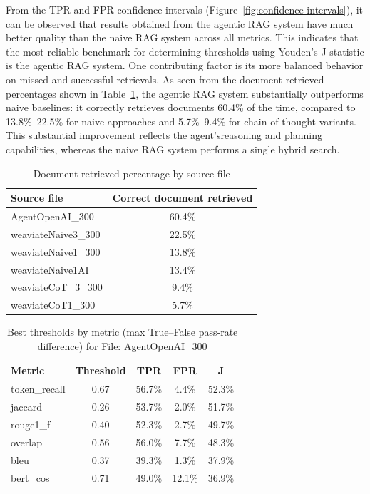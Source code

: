 From the TPR and FPR confidence intervals (Figure~\ref{fig:confidence-intervals}), it can be observed that results obtained from the agentic RAG system have much better quality than the naive RAG system across all metrics. This indicates that the most reliable benchmark for determining thresholds using Youden's J statistic is the agentic RAG system. One contributing factor is its more balanced behavior on missed and successful retrievals. As seen from the document retrieved percentages shown in Table~\ref{tab:doc-retrieved-by-source}, the agentic RAG system substantially outperforms naive baselines: it correctly retrieves documents 60.4\% of the time, compared to 13.8\%–22.5\% for naive approaches and 5.7\%–9.4\% for chain-of-thought variants. This substantial improvement reflects the agent'sreasoning and planning capabilities, whereas the naive RAG system performs a single hybrid search.

\begin{table}[htbp]
    \centering
    \begin{tabular}{l c}
        \hline
        Source file & Correct document retrieved \\
        \hline
    AgentOpenAI\_300 & 60.4\% \\
    weaviateNaive3\_300 & 22.5\% \\
    weaviateNaive1\_300 & 13.8\% \\
    weaviateNaive1AI & 13.4\% \\
    weaviateCoT\_3\_300 & 9.4\% \\
    weaviateCoT1\_300 & 5.7\% \\
        \hline
    \end{tabular}
    \caption{Document retrieved percentage by source file}\label{tab:doc-retrieved-by-source}
\end{table}

\begin{table}[htbp]
  \centering
  \begin{tabular}{l c c c c}
    \hline
    Metric & Threshold & TPR & FPR & J \\
    \hline
    token\_recall & 0.67 & 56.7\% & 4.4\%  & 52.3\% \\
    jaccard       & 0.26 & 53.7\% & 2.0\%  & 51.7\% \\
    rouge1\_f     & 0.40 & 52.3\% & 2.7\%  & 49.7\% \\
    overlap       & 0.56 & 56.0\% & 7.7\%  & 48.3\% \\
    bleu          & 0.37 & 39.3\% & 1.3\%  & 37.9\% \\
    bert\_cos     & 0.71 & 49.0\% & 12.1\% & 36.9\% \\
    \hline
  \end{tabular}
    \caption{Best thresholds by metric (max True--False pass-rate difference) for File: AgentOpenAI\_300}\label{tab:agentopenai300-best-thresholds}
\end{table}


